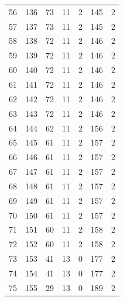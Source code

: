 \documentclass[a4paper,twoside,12pt]{book}
\begin{document}
\begin{appendices}
\begin{table}
\begin{tabular}{lrrrrrr}
		56  &    136 &        73 &        11 &               2 &             145 &         2 \\
		57  &    137 &        73 &        11 &               2 &             145 &         2 \\
		58  &    138 &        72 &        11 &               2 &             146 &         2 \\
		59  &    139 &        72 &        11 &               2 &             146 &         2 \\
		60  &    140 &        72 &        11 &               2 &             146 &         2 \\
		61  &    141 &        72 &        11 &               2 &             146 &         2 \\
		62  &    142 &        72 &        11 &               2 &             146 &         2 \\
		63  &    143 &        72 &        11 &               2 &             146 &         2 \\
		64  &    144 &        62 &        11 &               2 &             156 &         2 \\
		65  &    145 &        61 &        11 &               2 &             157 &         2 \\
		66  &    146 &        61 &        11 &               2 &             157 &         2 \\
		67  &    147 &        61 &        11 &               2 &             157 &         2 \\
		68  &    148 &        61 &        11 &               2 &             157 &         2 \\
		69  &    149 &        61 &        11 &               2 &             157 &         2 \\
		70  &    150 &        61 &        11 &               2 &             157 &         2 \\
		71  &    151 &        60 &        11 &               2 &             158 &         2 \\
		72  &    152 &        60 &        11 &               2 &             158 &         2 \\
		73  &    153 &        41 &        13 &               0 &             177 &         2 \\
		74  &    154 &        41 &        13 &               0 &             177 &         2 \\
		75  &    155 &        29 &        13 &               0 &             189 &         2 \\

\end{tabular}
\end{table}
\end{appendices}
\end{document}
